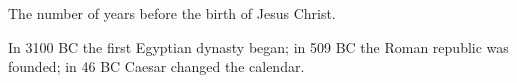 The number of years before the birth of Jesus Christ.
\par
In 3100 BC the first Egyptian dynasty began; in 509 BC the Roman republic was founded; in 
46 BC Caesar changed the calendar.

